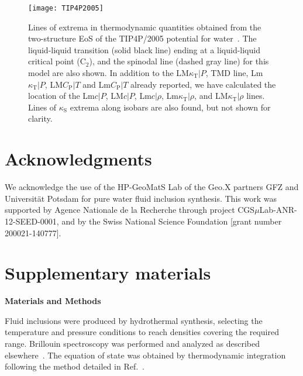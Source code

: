 \documentclass[12pt]{article}
\newcommand{\mrm}{\mathrm}
\newcommand{\kT}{\kappa_\mrm{T}}
\newcommand{\kS}{\kappa_\mrm{S}}
\newcommand{\CP}{C_\mrm{P}}
\begin{document}
\begin{figure}
\centerline{\texttt{[image: TIP4P2005]}}\caption{Lines of extrema in thermodynamic quantities obtained from the two-structure EoS of the TIP4P/2005 potential for water~\cite{Biddle_twostructure_2017}. The liquid-liquid transition (solid black line) ending at a liquid-liquid critical point (C$_2$), and the spinodal line (dashed gray line) for this model are also shown. In addition to the LM$\kT|P$, TMD line, Lm$\kT|P$, LM$\CP|T$ and Lm$\CP|T$ already reported, we have calculated the location of the Lm$c|P$, LM$c|P$, Lm$c|\rho$, Lm$\kT|\rho$, and LM$\kT|\rho$ lines. Lines of $\kS$ extrema along isobars are also found, but not shown for clarity.}
\label{fig:TIP4P2005}
\end{figure}

\section*{Acknowledgments}
We acknowledge the use of the HP-GeoMatS Lab of the Geo.X partners GFZ and Universit\"{a}t Potsdam for pure water fluid inclusion synthesis. This work was supported by Agence Nationale de la Recherche through project CGS$\mu$Lab-ANR-12-SEED-0001, and by the Swiss National Science Foundation [grant number 200021-140777].

\newpage
\section*{Supplementary materials}

\hspace{6mm}\textbf{Materials and Methods}

Fluid inclusions were produced by hydrothermal synthesis\cite{Bodnar_synthetic_1985}, selecting the temperature and pressure conditions to reach densities covering the required range. Brillouin spectroscopy was performed and analyzed as described elsewhere~\cite{Pallares_anomalies_2014}. The equation of state was obtained by thermodynamic integration following the method detailed in Ref.~\cite{Pallares_equation_2016}.\\
\end{document}
